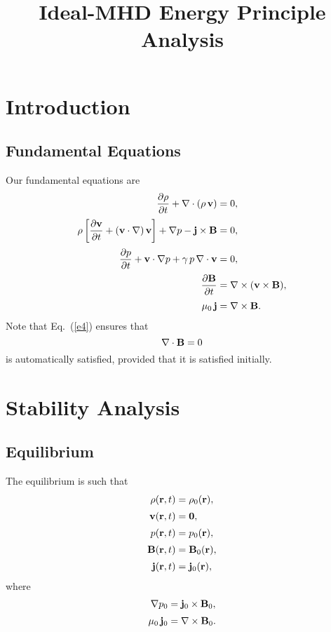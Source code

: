 \documentclass[12pt,prb,aps,notitlepage]{revtex4-1}
\begin{document}
\title{Ideal-MHD Energy Principle Analysis}
\maketitle

\section{Introduction}
\subsection{Fundamental Equations}
Our fundamental equations are
\begin{align}
\frac{\partial\rho}{\partial t} + \nabla\cdot(\rho\,{\bf v}) & =0,\label{e1}\\[0.5ex]
\rho\left[\frac{\partial{\bf v}}{\partial t} + ({\bf v}\cdot\nabla)\,{\bf v}\right]+\nabla p - {\bf j}\times {\bf B}&=0,\label{e2}\\[0.5ex]
\frac{\partial p}{\partial t}+{\bf v}\cdot\nabla p + \gamma\,p\,\nabla\cdot{\bf v} &=0,\label{e3}\\[0.5ex]
\frac{\partial {\bf B}}{\partial t} &= \nabla\times({\bf v}\times {\bf B}),\label{e4}\\[0.5ex]
\mu_0\,{\bf j} &= \nabla\times {\bf B}.\label{e5}
\end{align}
Note that Eq.~(\ref{e4}) ensures that 
\begin{equation}\label{e6}
\nabla\cdot{\bf B} = 0
\end{equation}
is automatically satisfied, provided that it is satisfied initially. 

\section{Stability Analysis}
\subsection{Equilibrium}
The equilibrium is such that
\begin{align}
\rho({\bf r},t) &= \rho_0({\bf r}),\\[0.5ex]
{\bf v}({\bf r},t) &= {\bf 0},\\[0.5ex]
p({\bf r},t) &= p_0({\bf r}),\\[0.5ex]
{\bf B}({\bf r},t) &= {\bf B}_0({\bf r}),\\[0.5ex]
{\bf j}({\bf r},t) &= {\bf j}_0({\bf r}),
\end{align}
where
\begin{align}\label{e11}
\nabla p_0 &= {\bf j}_0\times {\bf B}_0,\\[0.5ex]
\mu_0\,{\bf j}_0 &= \nabla\times {\bf B}_0.\label{e12}
\end{align}
\end{document}
